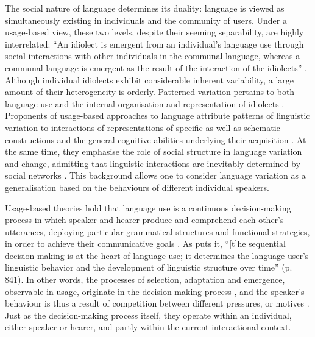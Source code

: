 The social nature of language determines its duality: language is viewed as simultaneously existing in individuals and the community of users. Under a usage-based view, these two levels, despite their seeming separability, are highly interrelated: ``An idiolect is emergent from an individual's language use through social interactions with other individuals in the communal language, whereas a communal language is emergent as the result of the interaction of the idiolects'' \citep[15]{five-graces}. Although individual idiolects exhibit considerable inherent variability, a large amount of their heterogeneity is orderly. Patterned variation pertains to both language use \citep{weinreich-etal68} and the internal organisation and representation of idiolects \citep{dabrowska1997}. Proponents of usage-based approaches to language attribute patterns of linguistic variation to interactions of representations of specific as well as schematic constructions and the general cognitive abilities underlying their acquisition \citep[15]{five-graces}. At the same time, they emphasise the role of social structure in language variation and change, admitting that linguistic interactions are inevitably determined by social networks \citep{milroy1980,eckert2000}. This background allows one to consider language variation as a generalisation based on the behaviours of different individual speakers.

Usage-based theories hold that language use is a continuous decision-making process in which speaker and hearer produce and comprehend each other's utterances, deploying particular grammatical structures and functional strategies, in order to achieve their communicative goals \citep{bates-macwhinney1989,five-graces,bybee-book-2010,dubois2014,macwhinney2014,christiansen-chater-2016}. As \citet{diessel-review} puts it, ``[t]he sequential decision-making is at the heart of language use; it determines the language user's linguistic behavior and the development of linguistic structure over time'' (p. 841). In other words, the processes of selection, adaptation and emergence, observable in usage, originate in the decision-making process \citep[264--265]{dubois2014}, and the speaker's behaviour is thus a result of competition between different pressures, or motives \citep{bates-macwhinney1989,competing}. Just as the decision-making process itself, they operate within an individual, either speaker or hearer, and partly within the current interactional context.

